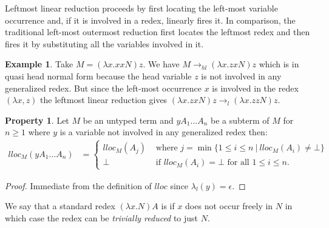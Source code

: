 \documentclass{article}
\theoremstyle{plain}
\theoremstyle{definition}
\newtheorem{property}{Property}[section]
\newtheorem{example}{Example}[section]
\theoremstyle{remark}
\begin{document}
Leftmost linear reduction proceeds by first locating the left-most variable occurrence and, if it is involved in a redex, linearly fires it. In comparison, the traditional left-most outermost reduction first locates the leftmost redex and then fires it by substituting all the variables involved in it.

\begin{example}
Take $M = (\lambda x. x x N) z$. We have $M \rightarrow_{hl} (\lambda x. z x N) z$ which is in quasi head normal form because the head variable $z$ is not involved in any generalized redex.
But since the left-most occurrence $x$ is involved in the redex $(\lambda x, z)$ the leftmost linear reduction gives $(\lambda x. z x N) z \rightarrow_l (\lambda x. z z N) z$.
\end{example}

\begin{property}
\label{prop:qnf_longapply}
    Let $M$ be an untyped term and $y A_1 \ldots A_n$ be a subterm of $M$ for $n\geq1$ where $y$ is a variable not involved in any generalized redex then:
    \begin{align*}
    lloc_M(y A_1 \ldots A_n) &=
        \begin{cases}
         lloc_M (A_j) &\mbox{ where } j = \min \{ 1\leq i\leq n \ | \ lloc_M (A_i) \neq \bot\} \\
         \bot &\mbox{ if } lloc_M(A_i) = \bot \mbox{ for all } 1\leq i\leq n.
        \end{cases}
    \end{align*}
\end{property}
\begin{proof}
    Immediate from the definition of $lloc$ since $\lambda_l(y) = \epsilon$.
\end{proof}

We say that a standard redex $(\lambda x. N) A$ is  if $x$ does not occur freely in $N$ in which case the redex can be \emph{trivially reduced} to just $N$.
\end{document}
